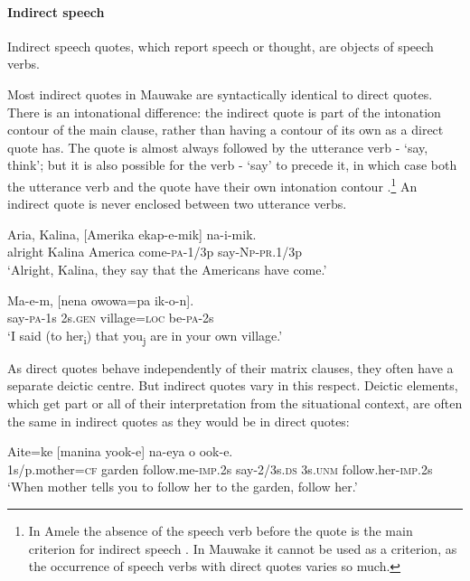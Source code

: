 \paragraph[Indirect speech]{Indirect speech} \label{sec:8.3.2.1.2}

Indirect speech quotes, which report speech or thought, are objects of speech verbs. 

Most indirect quotes in Mauwake are syntactically identical to direct quotes. There is an intonational difference: the indirect quote is part of the intonation contour of the main clause, rather than having a contour of its own as a direct quote has. The quote is almost always followed by the utterance verb - `say, think'; but it is also possible for the verb - `say' to precede it, in which case both the utterance verb and the quote have their own intonation contour .\footnote{In Amele the absence of the speech verb before the quote is the main criterion for indirect speech \citep[14]{Roberts1987}. In Mauwake it cannot be used as a criterion, as the occurrence of speech verbs with direct quotes varies so much.} An indirect quote is never enclosed between two utterance verbs. 

\ea%
\label{ex:8:x1585}
\gll Aria,  Kalina,  [Amerika  ekap-e-mik]  na-i-mik. \\
alright  Kalina  America  come-\textsc{pa}-1/3p say-\textsc{Np}-\textsc{pr}.1/3p\\
\glt`Alright, Kalina, they say that the Americans have come.'
\z


\ea%
\label{ex:8:x1587}
\gll Ma-e-m,  [nena  owowa=pa  ik-o-n].\\
say-\textsc{pa}-1s 2s.\textsc{gen} village=\textsc{loc} be-\textsc{pa}-2s\\
\glt`I said (to her\textsubscript{i}) that you\textsubscript{j} are in your own village.'
\z


As direct quotes behave independently of their matrix clauses, they often have a separate deictic centre. But indirect quotes vary in this respect. Deictic elements, which get part or all of their interpretation from the situational context, are often the same in indirect quotes as they would be in direct quotes: 

\ea%
\label{ex:8:x1584}
\gll Aite=ke  [manina  yook-e]  na-eya  o ook-e.\\
1s/p.mother=\textsc{cf} garden follow.me-\textsc{imp}.2s say-2/3s.\textsc{ds} 3s.\textsc{unm} follow.her-\textsc{imp}.2s\\
\glt`When mother tells you to follow her to the garden, follow her.'
\z


